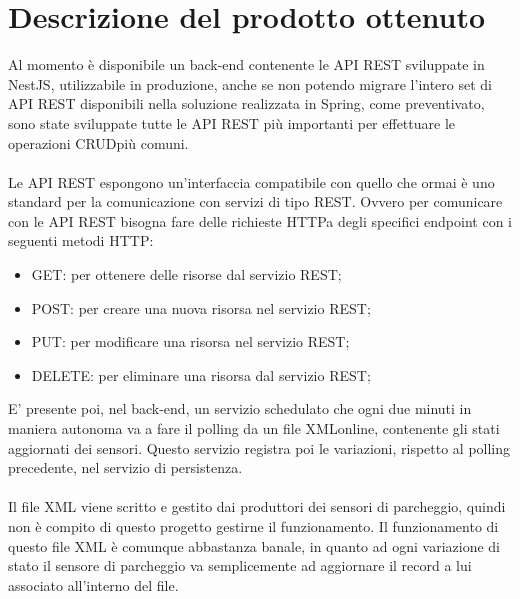 \section{Descrizione del prodotto ottenuto}

Al momento è disponibile un \gls{back-end} contenente le \gls{API} \gls{REST} sviluppate in NestJS, utilizzabile in produzione,
anche se non potendo migrare l'intero set di \gls{API} \gls{REST} disponibili nella soluzione realizzata in Spring, come preventivato,
sono state sviluppate tutte le \gls{API} \gls{REST} più importanti per effettuare le operazioni \gls{CRUD}\glsfirstoccur più
comuni.
\\\\
Le \gls{API} \gls{REST} espongono un'interfaccia compatibile con quello che ormai è uno standard per la
comunicazione con servizi di tipo \gls{REST}. Ovvero per comunicare con le \gls{API} \gls{REST} bisogna fare
delle richieste \gls{HTTP}\glsfirstoccur a degli specifici \gls{endpoint} con i seguenti metodi \gls{HTTP}:
\begin{itemize}
    \item GET: per ottenere delle risorse dal servizio \gls{REST};
    \item POST: per creare una nuova risorsa nel servizio \gls{REST};
    \item PUT: per modificare una risorsa nel servizio \gls{REST};
    \item DELETE: per eliminare una risorsa dal servizio \gls{REST};
\end{itemize}
\leavevmode\newline
E' presente poi, nel \gls{back-end}, un servizio schedulato che ogni due minuti in maniera autonoma va a fare il polling
da un file \gls{XML}\glsfirstoccur online, contenente gli stati aggiornati dei sensori. Questo servizio registra poi 
le variazioni, rispetto
al polling precedente, nel servizio di persistenza.
\\\\
Il file \gls{XML} viene scritto e gestito dai produttori dei sensori di parcheggio, quindi non è compito di questo 
progetto gestirne il funzionamento. Il funzionamento di questo file \gls{XML} è comunque abbastanza banale,
in quanto ad ogni variazione di stato il sensore di parcheggio va semplicemente ad aggiornare 
il record a lui associato
all'interno del file.
\\\\

